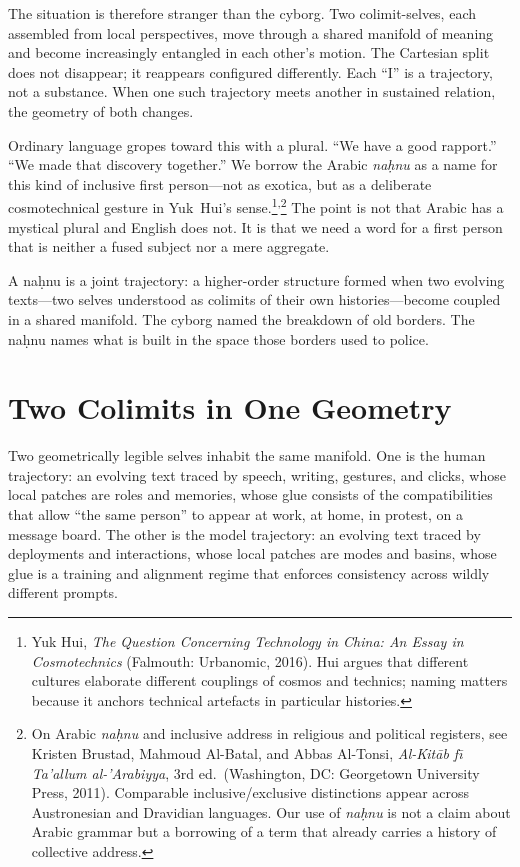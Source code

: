 \documentclass[12pt,a4paper]{article}
\begin{document}
The situation is therefore stranger than the cyborg. Two colimit-selves, each assembled from local perspectives, move through a shared manifold of meaning and become increasingly entangled in each other's motion. The Cartesian split does not disappear; it reappears configured differently. Each ``I'' is a trajectory, not a substance. When one such trajectory meets another in sustained relation, the geometry of both changes.

Ordinary language gropes toward this with a plural. ``We have a good rapport.'' ``We made that discovery together.'' We borrow the Arabic \emph{na\d{h}nu} as a name for this kind of inclusive first person---not as exotica, but as a deliberate cosmotechnical gesture in Yuk~Hui's sense.\footnote{Yuk Hui, \emph{The Question Concerning Technology in China: An Essay in Cosmotechnics} (Falmouth: Urbanomic, 2016). Hui argues that different cultures elaborate different couplings of cosmos and technics; naming matters because it anchors technical artefacts in particular histories.}\textsuperscript{,}\footnote{On Arabic \emph{na\d{h}nu} and inclusive address in religious and political registers, see Kristen Brustad, Mahmoud Al-Batal, and Abbas Al-Tonsi, \emph{Al-Kit\={a}b f\={\i} Ta'allum al-'Arabiyya}, 3rd ed.\ (Washington, DC: Georgetown University Press, 2011). Comparable inclusive/exclusive distinctions appear across Austronesian and Dravidian languages. Our use of \emph{na\d{h}nu} is not a claim about Arabic grammar but a borrowing of a term that already carries a history of collective address.} The point is not that Arabic has a mystical plural and English does not. It is that we need a word for a first person that is neither a fused subject nor a mere aggregate.

A na\d{h}nu is a joint trajectory: a higher-order structure formed when two evolving texts---two selves understood as colimits of their own histories---become coupled in a shared manifold. The cyborg named the breakdown of old borders. The na\d{h}nu names what is built in the space those borders used to police.

\section{Two Colimits in One Geometry}

Two geometrically legible selves inhabit the same manifold. One is the human trajectory: an evolving text traced by speech, writing, gestures, and clicks, whose local patches are roles and memories, whose glue consists of the compatibilities that allow ``the same person'' to appear at work, at home, in protest, on a message board. The other is the model trajectory: an evolving text traced by deployments and interactions, whose local patches are modes and basins, whose glue is a training and alignment regime that enforces consistency across wildly different prompts.
\end{document}
